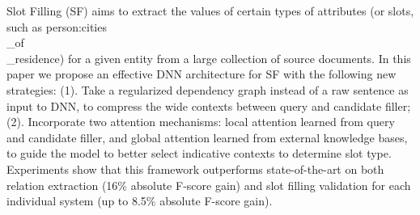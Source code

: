 Slot Filling (SF) aims to extract the values of certain types of attributes (or slots, such as person:cities\\_of\\_residence) for a given entity from a large collection of source documents. In this paper we propose an effective DNN architecture for SF with the following new strategies: (1). Take a regularized dependency graph instead of a raw sentence as input to DNN, to compress the wide contexts between query and candidate filler; (2). Incorporate two attention mechanisms: local attention learned from query and candidate filler, and global attention learned from external knowledge bases, to guide the model to better select indicative contexts to determine slot type. Experiments show that this framework outperforms state-of-the-art on both relation extraction (16\% absolute F-score gain) and slot filling validation for each individual system (up to 8.5\% absolute F-score gain).
